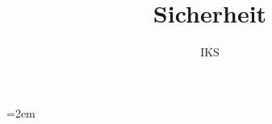 \documentclass[11pt, oneside, ngerman]{book}
\title{Sicherheit}
\author{IKS}
\begin{document}
\frontmatter



\tableofcontents

\mainmatter

















\appendix



\emergencystretch=2em
\printindex

\backmatter

\nocite{*}


\end{document}
